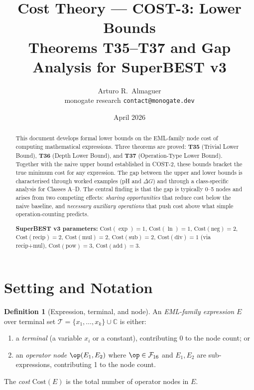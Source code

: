 \documentclass[12pt,a4paper]{article}
\title{Cost Theory --- COST-3: Lower Bounds\\[4pt]
       \large Theorems T35--T37 and Gap Analysis for SuperBEST v3}
\author{Arturo R.\ Almaguer\\
\small monogate research \quad \texttt{contact@monogate.dev}}
\date{April 2026}
\theoremstyle{definition}
\newtheorem{definition}[theorem]{Definition}
\newcommand{\Cost}{\mathrm{Cost}}
\newcommand{\Fam}{\mathcal{F}}
\newcommand{\Term}{\mathcal{T}}
\begin{document}
\maketitle

\begin{abstract}
This document develops formal lower bounds on the EML-family node cost of
computing mathematical expressions.  Three theorems are proved:
\textbf{T35} (Trivial Lower Bound),
\textbf{T36} (Depth Lower Bound), and
\textbf{T37} (Operation-Type Lower Bound).
Together with the naive upper bound established in COST-2, these bounds
bracket the true minimum cost for any expression.  The gap between the upper
and lower bounds is characterised through worked examples (pH and $\Delta G$)
and through a class-specific analysis for Classes A--D.
The central finding is that the gap is typically 0--5 nodes and arises from
two competing effects: \emph{sharing opportunities} that reduce cost below
the naive baseline, and \emph{necessary auxiliary operations} that push cost
above what simple operation-counting predicts.

\medskip
\noindent\textbf{SuperBEST v3 parameters:}
$\Cost(\exp)=1$, $\Cost(\ln)=1$, $\Cost(\mathrm{neg})=2$,
$\Cost(\mathrm{recip})=2$, $\Cost(\mathrm{mul})=2$, $\Cost(\mathrm{sub})=2$,
$\Cost(\mathrm{div})=1$ (via recip+mul), $\Cost(\mathrm{pow})=3$,
$\Cost(\mathrm{add})=3$.
\end{abstract}

\tableofcontents
\bigskip

\section{Setting and Notation}

\begin{definition}[Expression, terminal, and node]\label{def:expression}
An \emph{EML-family expression} $E$ over terminal set
$\Term = \{x_1,\ldots,x_k\} \cup \mathbb{C}$ is either:
\begin{enumerate}
  \item a \emph{terminal} (a variable $x_i$ or a constant), contributing 0
        to the node count; or
  \item an \emph{operator node} $\op(E_1,E_2)$ where $\op \in \Fam_{16}$
        and $E_1, E_2$ are sub-expressions, contributing 1 to the node count.
\end{enumerate}
The \emph{cost} $\Cost(E)$ is the total number of operator nodes in $E$.
\end{definition}
\end{document}
